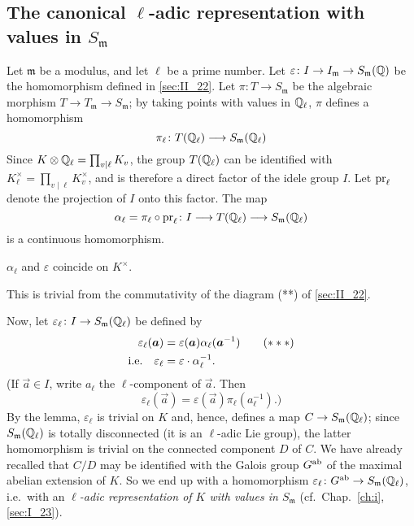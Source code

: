 \subsection{The canonical \texorpdfstring{$\ell$}{l}-adic representation with
values in \texorpdfstring{$S_{\mathfrak{m}}$}{Sm}}
\label{sec:II_23}
Let $\mathfrak{m}$ be a modulus, and let $\ell$ be a prime number. Let
$\varepsilon\colon I \to I_{\mathfrak{m}} \to S_{\mathfrak{m}}(\Q)$ be the
homomorphism defined in \ref{sec:II_22}. Let $\pi\colon T \to S_{\mathfrak{m}}$
be the algebraic morphism $T \to T_{\mathfrak{m}} \to S_{\mathfrak{m}}$; by
taking points with values in $\Q_\ell$, $\pi$ defines a homomorphism
\[
	\pi_\ell \colon T(\Q_\ell) \longrightarrow S_{\mathfrak{m}}(\Q_\ell)
\]
Since $K \otimes \Q_\ell = \prod_{v\mid\ell} K_v$, the group $T(\Q_\ell)$ can
be identified with $K_\ell^\times = \prod_{v\mid\ell} K_v^\times$, and is
therefore a direct factor of the idele group $I$.  Let $\pr_\ell$ denote the
projection of $I$ onto this factor. The map
\[
	\alpha_\ell = \pi_\ell \circ \pr_\ell \colon I \longrightarrow T(\Q_\ell)
	\longrightarrow S_{\mathfrak{m}}(\Q_\ell)
\]
is a continuous homomorphism.
\begin{lem}
	$\alpha_\ell$ and $\varepsilon$ coincide on $K^\times$.
\end{lem}
This is trivial from the commutativity of the diagram (**) of \ref{sec:II_22}.

Now, let $\varepsilon_\ell \colon I \to
S_{\mathfrak{m}}(\Q_\ell)$ be defined by
\dpage
\begin{align}
	\varepsilon_\ell(\vec a) &= \varepsilon(\vec a) \alpha_\ell(\vec a^{-1})
	\tag{$***$}\label{eqn:II_23_star} \\
	\text{i.e.} \quad \varepsilon_\ell &= \varepsilon \cdot \alpha_\ell^{-1}.
	\notag
\end{align}
(If $\vec a \in I$, write $a_\ell$ the $\ell$-component of $\vec a$. Then
\[
	\varepsilon_\ell(\vec a) = \varepsilon(\vec a) \pi_\ell(a_\ell^{-1}).)
\]
By the lemma, $\varepsilon_\ell$ is trivial on $K$ and, hence, defines a map
$C \to S_{\mathfrak{m}}(\Q_\ell)$; since $S_{\mathfrak{m}}(\Q_\ell)$ is
totally disconnected (it is an $\ell$-adic Lie group), the latter homomorphism is
trivial on the connected component $D$ of $C$. We have already recalled that $C/D$
may be identified with the Galois group $\abcl G$ of the maximal abelian
extension of $K$. So we end up with a homomorphism $\varepsilon_\ell \colon
\abcl G \to S_{\mathfrak{m}}(\Q_\ell)$, i.e.\ with an \emph{$\ell$-adic
representation of $K$ with values in $S_{\mathfrak{m}}$} (cf.\ 
Chap.~\ref{ch:i}, \ref{sec:I_23}).

